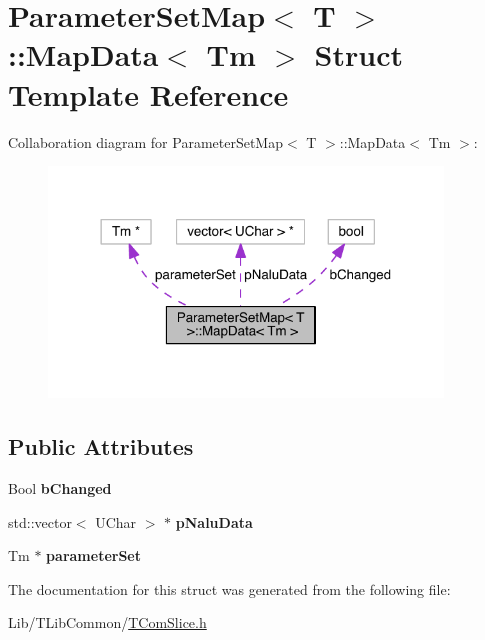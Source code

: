 \hypertarget{struct_parameter_set_map_1_1_map_data}{}\section{Parameter\+Set\+Map$<$ T $>$\+:\+:Map\+Data$<$ Tm $>$ Struct Template Reference}
\label{struct_parameter_set_map_1_1_map_data}


Collaboration diagram for Parameter\+Set\+Map$<$ T $>$\+:\+:Map\+Data$<$ Tm $>$\+:
\nopagebreak
\begin{figure}[H]
\begin{center}
\leavevmode
\includegraphics[width=297pt]{de/dd5/struct_parameter_set_map_1_1_map_data__coll__graph}
\end{center}
\end{figure}
\subsection*{Public Attributes}
\begin{DoxyCompactItemize}
\item 
\mbox{\label{struct_parameter_set_map_1_1_map_data_a61097b235246a9ea8db86febdf943601}} 
Bool {\bfseries b\+Changed}
\item 
\mbox{\label{struct_parameter_set_map_1_1_map_data_a33457d16b94f734857094bc85a89511d}} 
std\+::vector$<$ U\+Char $>$ $\ast$ {\bfseries p\+Nalu\+Data}
\item 
\mbox{\label{struct_parameter_set_map_1_1_map_data_a17c1a8dd8e680a87f7f67fce7cbe3540}} 
Tm $\ast$ {\bfseries parameter\+Set}
\end{DoxyCompactItemize}


The documentation for this struct was generated from the following file\+:\begin{DoxyCompactItemize}
\item 
Lib/\+T\+Lib\+Common/\hyperlink{_t_com_slice_8h}{T\+Com\+Slice.\+h}\end{DoxyCompactItemize}
